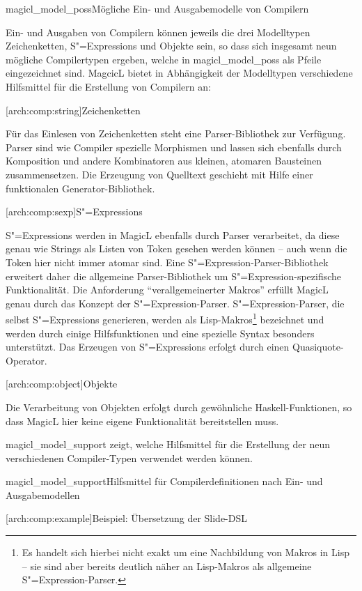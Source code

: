 \documentclass[12pt, a4paper, bibgerm]{scrbook}
\newcommand\lsubsubsection{}
\newcommand\abb{}
\newcommand\fig{}
\newcommand{\sexp}{S"=Expression}
\newcommand{\sexps}{S"=Expressions}
\begin{document}
\fig{magicl_model_poss}{Mögliche Ein- und Ausgabemodelle von Compilern}

Ein- und Ausgaben von Compilern können jeweils die drei Modelltypen
Zeichenketten, \sexps{} und Objekte sein, so dass sich insgesamt neun
mögliche Compilertypen ergeben, welche in \abb{magicl_model_poss} als
Pfeile eingezeichnet sind. MagcicL bietet in Abhängigkeit der
Modelltypen verschiedene Hilfsmittel für die Erstellung von Compilern
an:

\lsubsubsection[arch:comp:string]{Zeichenketten}

Für das Einlesen von Zeichenketten steht eine Parser-Bibliothek zur
Verfügung. Parser sind wie Compiler spezielle Morphismen und lassen sich
ebenfalls durch Komposition und andere Kombinatoren aus kleinen,
atomaren Bausteinen zusammensetzen. Die Erzeugung von Quelltext
geschieht mit Hilfe einer funktionalen Generator-Bibliothek.

\lsubsubsection[arch:comp:sexp]{\sexps}

\sexps{} werden in MagicL ebenfalls durch Parser verarbeitet, da diese
genau wie Strings als Listen von Token gesehen werden können -- auch
wenn die Token hier nicht immer atomar sind. Eine
\sexp{}-Parser-Bibliothek erweitert daher die allgemeine
Parser-Bibliothek um \sexp{}-spezifische Funktionalität. Die Anforderung
``verallgemeinerter Makros'' erfüllt MagicL genau durch das Konzept der
\sexp{}-Parser. \sexp{}-Parser, die selbst \sexps{} generieren, werden
als Lisp-Makros\footnote{Es handelt sich hierbei nicht exakt um eine
  Nachbildung von Makros in Lisp -- sie sind aber bereits deutlich näher
  an Lisp-Makros als allgemeine \sexp{}-Parser.} bezeichnet und werden
durch einige Hilfsfunktionen und eine spezielle Syntax besonders
unterstützt. Das Erzeugen von \sexps{} erfolgt durch einen
Quasiquote-Operator.

\lsubsubsection[arch:comp:object]{Objekte}

Die Verarbeitung von Objekten erfolgt durch gewöhnliche
Haskell-Funktionen, so dass MagicL hier keine eigene Funktionalität
bereitstellen muss. 

\medskip{}

\abb{magicl_model_support} zeigt, welche Hilfsmittel für die Erstellung
der neun verschiedenen Compiler-Typen verwendet werden können.

\fig{magicl_model_support}{Hilfsmittel für Compilerdefinitionen nach
  Ein- und Ausgabemodellen}

\lsubsubsection[arch:comp:example]{Beispiel: Übersetzung der Slide-DSL}
\end{document}
